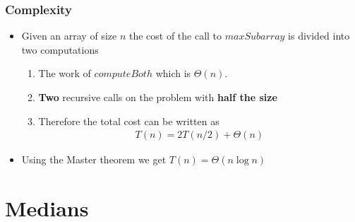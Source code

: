 \documentclass{beamer}
\begin{document}
%   
    

%       
    

\begin{frame}
  \frametitle{Complexity}
  \begin{itemize}
  \item Given an array of size $n$ the cost of the call to $maxSubarray$ is
    divided into two computations
    \begin{enumerate}
  \item The work of $computeBoth$ which is $\Theta(n)$.
  \item \textbf{Two} recursive calls on the problem with \textbf{half the size}
  \item Therefore the total cost can be written as
    \begin{align*}
      T(n)=2T(n/2)+\Theta(n)
    \end{align*}
    \end{enumerate}
\item Using the Master theorem we get $T(n)=\Theta(n\log n)$
  \end{itemize}
\end{frame}



\section{Medians}
\end{document}
